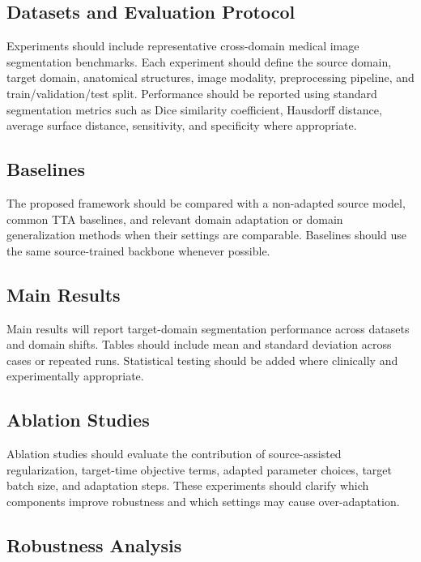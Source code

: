 \documentclass[diagnostics,article,submit,pdftex,moreauthors]{Definitions/mdpi}
\begin{document}
\subsection{Datasets and Evaluation Protocol}

Experiments should include representative cross-domain medical image segmentation benchmarks. Each experiment should define the source domain, target domain, anatomical structures, image modality, preprocessing pipeline, and train/validation/test split. Performance should be reported using standard segmentation metrics such as Dice similarity coefficient, Hausdorff distance, average surface distance, sensitivity, and specificity where appropriate.

\subsection{Baselines}

The proposed framework should be compared with a non-adapted source model, common TTA baselines, and relevant domain adaptation or domain generalization methods when their settings are comparable. Baselines should use the same source-trained backbone whenever possible.

\subsection{Main Results}

Main results will report target-domain segmentation performance across datasets and domain shifts. Tables should include mean and standard deviation across cases or repeated runs. Statistical testing should be added where clinically and experimentally appropriate.

\subsection{Ablation Studies}

Ablation studies should evaluate the contribution of source-assisted regularization, target-time objective terms, adapted parameter choices, target batch size, and adaptation steps. These experiments should clarify which components improve robustness and which settings may cause over-adaptation.

\subsection{Robustness Analysis}
\end{document}
